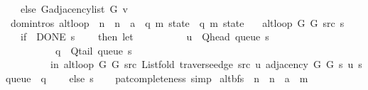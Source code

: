 \begin{isabellebody}
\ \ \ else\ G{\isachardot}{\kern0pt}adjacency{\isacharunderscore}{\kern0pt}list\ G{}\ v{\isachardoublequoteclose}\isanewline
\isanewline
{}\isamarkupfalse%
\ {\isacharparenleft}{\kern0pt}domintros{\isacharparenright}{\kern0pt}\ alt{\isacharunderscore}{\kern0pt}loop\ {\isacharcolon}{\kern0pt}{\isacharcolon}{\kern0pt}\ {\isachardoublequoteopen}{\isacharprime}{\kern0pt}n\ {\isasymRightarrow}\ {\isacharprime}{\kern0pt}n\ {\isasymRightarrow}\ {\isacharprime}{\kern0pt}a\ {\isasymRightarrow}\ {\isacharparenleft}{\kern0pt}{\isacharprime}{\kern0pt}q{\isacharcomma}{\kern0pt}\ {\isacharprime}{\kern0pt}m{\isacharparenright}{\kern0pt}\ state\ {\isasymRightarrow}\ {\isacharparenleft}{\kern0pt}{\isacharprime}{\kern0pt}q{\isacharcomma}{\kern0pt}\ {\isacharprime}{\kern0pt}m{\isacharparenright}{\kern0pt}\ state{\isachardoublequoteclose}\ \isanewline
\ \ {\isachardoublequoteopen}alt{\isacharunderscore}{\kern0pt}loop\ G{}\ G{}\ src\ s\ {\isacharequal}{\kern0pt}\isanewline
\ \ \ {\isacharparenleft}{\kern0pt}if\ {\isasymnot}\ DONE\ s\isanewline
\ \ \ \ then\ let\isanewline
\ \ \ \ \ \ \ \ \ \ u\ {\isacharequal}{\kern0pt}\ Q{\isacharunderscore}{\kern0pt}head\ {\isacharparenleft}{\kern0pt}queue\ s{\isacharparenright}{\kern0pt}{\isacharsemicolon}{\kern0pt}\isanewline
\ \ \ \ \ \ \ \ \ \ q\ {\isacharequal}{\kern0pt}\ Q{\isacharunderscore}{\kern0pt}tail\ {\isacharparenleft}{\kern0pt}queue\ s{\isacharparenright}{\kern0pt}\isanewline
\ \ \ \ \ \ \ \ \ in\ alt{\isacharunderscore}{\kern0pt}loop\ G{}\ G{}\ src\ {\isacharparenleft}{\kern0pt}List{\isachardot}{\kern0pt}fold\ {\isacharparenleft}{\kern0pt}traverse{\isacharunderscore}{\kern0pt}edge\ src\ u{\isacharparenright}{\kern0pt}\ {\isacharparenleft}{\kern0pt}adjacency\ G{}\ G{}\ s\ u{\isacharparenright}{\kern0pt}\ {\isacharparenleft}{\kern0pt}s{\isasymlparr}queue\ {\isacharcolon}{\kern0pt}{\isacharequal}{\kern0pt}\ q{\isasymrparr}{\isacharparenright}{\kern0pt}{\isacharparenright}{\kern0pt}\isanewline
\ \ \ \ else\ s{\isacharparenright}{\kern0pt}{\isachardoublequoteclose}\isanewline
%
\isadelimproof
\ \ %
\endisadelimproof
%
\isatagproof
{}\isamarkupfalse%
\ pat{\isacharunderscore}{\kern0pt}completeness\ simp%
\endisatagproof
{\isafoldproof}%
%
\isadelimproof
\isanewline
%
\endisadelimproof
\isanewline
{}\isamarkupfalse%
\ alt{\isacharunderscore}{\kern0pt}bfs\ {\isacharcolon}{\kern0pt}{\isacharcolon}{\kern0pt}\ {\isachardoublequoteopen}{\isacharprime}{\kern0pt}n\ {\isasymRightarrow}\ {\isacharprime}{\kern0pt}n\ {\isasymRightarrow}\ {\isacharprime}{\kern0pt}a\ {\isasymRightarrow}\ {\isacharprime}{\kern0pt}m{\isachardoublequoteclose}\ \isanewline

\end{isabellebody}
